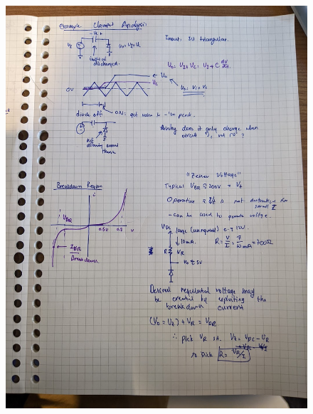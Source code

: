 \documentclass[../notes.tex]{subfiles}
\begin{document}
\begin{fullpage}
\begin{figure}[H]
	\centering
	\includegraphics[width=\linewidth]{img/image_2022-09-29-16-34-15.png}
\end{figure}
\end{fullpage}
\end{document}
